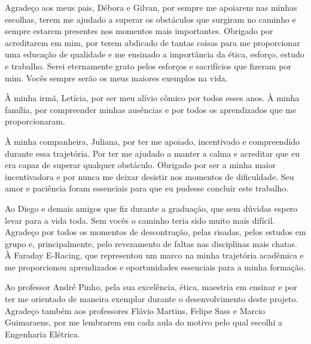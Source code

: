 \begin{agradecimentos}
\sloppy	

Agradeço aos meus pais, Débora e Gilvan, por sempre me apoiarem nas minhas escolhas, terem me ajudado a superar os obstáculos 
que surgiram no caminho e sempre estarem presentes nos momentos mais importantes. Obrigado por acreditarem em mim, por 
terem abdicado de tantas coisas para me proporcionar uma educação de qualidade e me ensinado a importância da ética, esforço, 
estudo e trabalho. Serei eternamente grato pelos esforços e sacrifícios que fizeram por mim. Vocês sempre serão os meus 
maiores exemplos na vida.

À minha irmã, Letícia, por ser meu alívio cômico por todos esses anos. À minha família, por compreender minhas ausências
e por todos os aprendizados que me proporcionaram.

À minha companheira, Juliana, por ter me apoiado, incentivado e compreendido durante essa trajetória. Por ter me 
ajudado a manter a calma e acreditar que eu era capaz de superar qualquer obstáculo. Obrigado por ser a
minha maior incentivadora e por nunca me deixar desistir nos momentos de dificuldade. Seu amor e paciência foram
essenciais para que eu pudesse concluir este trabalho.

Ao Diego e demais amigos que fiz durante a graduação, que sem dúvidas espero levar para a vida toda. Sem vocês o caminho
teria sido muito mais difícil. Agradeço por todos os momentos de descontração, pelas risadas, pelos estudos em grupo e, 
principalmente, pelo revezamento de faltas nas disciplinas mais chatas. À Faraday E-Racing, que representou um marco
na minha trajetória acadêmica e me proporcionou aprendizados e oportunidades essenciais para a minha formação.

Ao professor André Pinho, pela sua excelência, ética, maestria em ensinar e por ter me orientado de maneira exemplar
durante o desenvolvimento deste projeto. Agradeço também aos professores Flávio Martins, Felipe 
Sass e Marcio Guimaraens, por me lembrarem em cada aula do motivo pelo qual escolhi a Engenharia Elétrica. 

\end{agradecimentos}